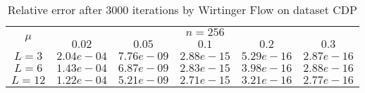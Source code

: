 \begin{table}\label{gaussian}
\centering
\begin{tabular}{|c|c|c|c|c|c|}

\hline
\multirow{2}{*}{ $\mu$} &\multicolumn{5}{c|}{$n = 256 $}\\\cline{2-6}
 &$0.02$ &$0.05$ &$0.1$ &$0.2$ &$0.3$\\\hline
$L=3$ & $2.04e-04$ & $7.76e-09$ & $2.88e-15$ & $5.29e-16$ & $2.87e-16$\\\hline
$L=6$ & $1.43e-04$ & $6.87e-09$ & $2.83e-15$ & $3.98e-16$ & $2.88e-16$\\\hline
$L=12$ & $1.22e-04$ & $5.21e-09$ & $2.71e-15$ & $3.21e-16$ & $2.77e-16$\\\hline
\end{tabular}
\caption{Relative error after $3000$ iterations by Wirtinger Flow on dataset CDP}
\end{table}
